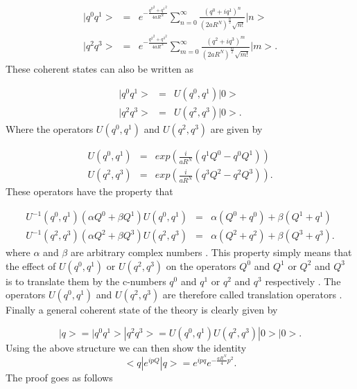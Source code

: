 \documentclass[a4paper,12pt]{article}
\begin{document}
\begin{eqnarray}
|q^0q^1>&=&e^{-\frac{{q^0}^2+{q^1}^2}{4aR^N}}\sum_{n=0}^{\infty}\frac{(q^0 + i q^1)^n}{(2aR^N)^{\frac{n}{2}}\sqrt{n!}}|n>\nonumber\\
|q^2q^3>&=&e^{-\frac{{q^2}^2 +
{q^3}^2}{4aR^N}}\sum_{m=0}^{\infty}\frac{(q^2 + i
q^3)^m}{(2aR^N)^{\frac{m}{2}}\sqrt{m!}}|m>.
\end{eqnarray}
These coherent states can also be written as

\begin{eqnarray}
|q^0q^1>&=&U(q^0,q^1)|0>\nonumber\\
|q^2q^3>&=&U(q^2,q^3)|0>.
\end{eqnarray}
Where the operators $U(q^0,q^1)$ and $U(q^2,q^3)$ are given by

\begin{eqnarray}
U(q^0,q^1)&=&exp(\frac{i}{aR^N}(q^1Q^0 - q^0Q^1))\nonumber\\
U(q^2,q^3)&=&exp(\frac{i}{aR^N}(q^3Q^2 - q^2Q^3)).
\end{eqnarray}
These operators have the property that

\begin{eqnarray}
U^{-1}(q^0,q^1)({\alpha}Q^0 +{\beta}Q^1)U(q^0,q^1)&=&{\alpha}(Q^0 + q^0) +{\beta}(Q^1 + q^1)\nonumber\\
U^{-1}(q^2,q^3)({\alpha}Q^2 +{\beta}Q^3)U(q^2,q^3)&=&{\alpha}(Q^2 + q^2) +{\beta}(Q^3 + q^3).
\end{eqnarray}
where ${\alpha}$ and ${\beta}$ are arbitrary complex numbers .
This property simply means that the effect of $U(q^0,q^1)$ or
$U(q^2,q^3)$ on the operators $Q^0$ and $Q^1$ or $Q^2$ and $Q^3$
is to translate them by the c-numbers $q^0$ and $q^1$ or $q^2$
and $q^3$ respectively . The operators $U(q^0,q^1)$ and
$U(q^2,q^3)$ are therefore called translation operators . Finally
a general coherent state of the theory is clearly given by

\begin{equation}
|q>=|q^0q^1>|q^2q^3>=U(q^0,q^1)U(q^2,q^3)|0>|0>.
\end{equation}
Using the above structure we can then show the identity
\begin{equation}
<q|e^{ipQ}|q>=e^{ipq}e^{-\frac{aR^N}{4}p^2}.
\end{equation}
The proof goes as follows
\end{document}
